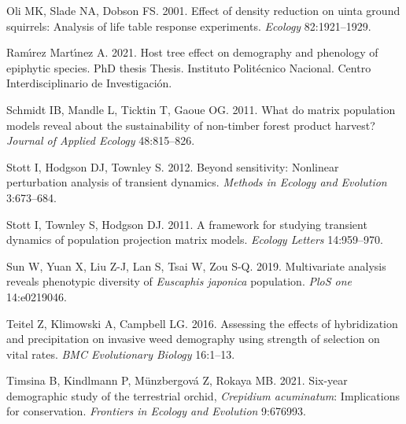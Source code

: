 \documentclass[
  12pt,
  letterpaper,
]{book}
\newlength{\cslhangindent}
\newenvironment{CSLReferences}[2] %
 {\begin{list}{}{%
  \setlength{\itemindent}{0pt}
  \setlength{\leftmargin}{0pt}
  \setlength{\parsep}{0pt}
  \ifodd #1
   \setlength{\leftmargin}{\cslhangindent}
   \setlength{\itemindent}{-1\cslhangindent}
  \fi
  \setlength{\itemsep}{#2\baselineskip}}}
 {\end{list}}
\begin{document}
\begin{CSLReferences}{1}{0}
Oli MK, Slade NA, Dobson FS. 2001. Effect of density reduction on uinta
ground squirrels: Analysis of life table response experiments.
\emph{Ecology} 82:1921--1929.

Ramı́rez Martı́nez A. 2021. Host tree effect on demography and phenology
of epiphytic species. PhD thesis Thesis. Instituto Polit{é}cnico
Nacional. Centro Interdisciplinario de Investigaci{ó}n.

Schmidt IB, Mandle L, Ticktin T, Gaoue OG. 2011. What do matrix
population models reveal about the sustainability of non-timber forest
product harvest? \emph{Journal of Applied Ecology} 48:815--826.

Stott I, Hodgson DJ, Townley S. 2012. Beyond sensitivity: Nonlinear
perturbation analysis of transient dynamics. \emph{Methods in Ecology
and Evolution} 3:673--684.

Stott I, Townley S, Hodgson DJ. 2011. A framework for studying transient
dynamics of population projection matrix models. \emph{Ecology Letters}
14:959--970.

Sun W, Yuan X, Liu Z-J, Lan S, Tsai W, Zou S-Q. 2019. Multivariate
analysis reveals phenotypic diversity of \emph{{E}uscaphis {j}aponica}
population. \emph{PloS one} 14:e0219046.

Teitel Z, Klimowski A, Campbell LG. 2016. Assessing the effects of
hybridization and precipitation on invasive weed demography using
strength of selection on vital rates. \emph{BMC Evolutionary Biology}
16:1--13.

Timsina B, Kindlmann P, Münzbergová Z, Rokaya MB. 2021. Six-year
demographic study of the terrestrial orchid, \emph{{C}repidium
{a}cuminatum}: Implications for conservation. \emph{Frontiers in Ecology
and Evolution} 9:676993.

\end{CSLReferences}


\backmatter
\end{document}
